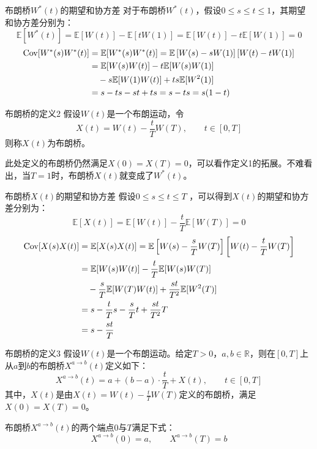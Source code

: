 \documentclass[t]{beamer}
\newcommand{\E}{\mathbb{E}}
\newcommand{\Cov}{{\rm Cov}}
\begin{document}
\begin{frame}{布朗桥$W^*(t)$的期望和协方差}
  对于布朗桥$W^*(t)$，假设$0\le s\le t\le 1$，其期望和协方差分别为：
  \begin{equation*}
  \E[W^*(t)]=\E[W(t)]-\E[tW(1)]=\E[W(t)]-t\E[W(1)]=0
  \end{equation*}
  \begin{equation*}
  \begin{split}
  \Cov[W^*(s)W^*(t)]&=\E[W^*(s)W^*(t)]=\E\left[W(s)-sW(1)\right]\left[W(t)-tW(1)\right]\\
  &=\E[W(s)W(t)]-t\E[W(s)W(1)]\\
  &\quad -s\E[W(1)W(t)]+ts\E[W^2(1)]\\
  &=s-ts-st+ts=s-ts=s(1-t)
  \end{split}
  \end{equation*}
\end{frame}


\begin{frame}{布朗桥的定义2}
  假设$W(t)$是一个布朗运动，令
  \begin{equation*}
  X(t)=W(t)-\frac{t}{T}W(T),\qquad t\in[0,T]
  \end{equation*}
  则称$X(t)$为布朗桥。

  此处定义的布朗桥仍然满足$X(0)=X(T)=0$，可以看作定义1的拓展。不难看出，当$T=1$时，布朗桥$X(t)$就变成了$W^*(t)$。
\end{frame}


\begin{frame}{布朗桥$X(t)$的期望和协方差}
  假设$0\le s\le t\le T$
  ，可以得到$X(t)$的期望和协方差分别为：
  \begin{equation*}
  \E[X(t)]=\E[W(t)]-\frac{t}{T}\E[W(T)]=0
  \end{equation*}
  \begin{equation*}
  \begin{split}
  \Cov[X(s)X(t)]&=\E[X(s)X(t)]=\E\left[W(s)-\frac{s}{T}W(T)\right]\left[W(t)-\frac{t}{T}W(T)\right]\\
  &=\E[W(s)W(t)]-\frac{t}{T}\E[W(s)W(T)]\\
  &\quad -\frac{s}{T}\E[W(T)W(t)]+\frac{st}{T^2}\E[W^2(T)]\\
  &=s-\frac{t}{T}s-\frac{s}{T}t+\frac{st}{T^2}T\\
  &=s-\frac{st}{T}
  \end{split}
  \end{equation*}
\end{frame}


\begin{frame}{布朗桥的定义3}
  假设$W(t)$是一个布朗运动。给定$T>0$，$a,b\in\mathbb{R}$，则在$[0,T]$上从$a$到$b$的布朗桥$X^{a\to b}(t)$定义如下：
  \begin{equation*}
  X^{a\to b}(t)=a+(b-a)\cdot \frac{t}{T}+X(t), \qquad t\in[0,T]
  \end{equation*}
  其中，$X(t)$是由$X(t)=W(t)-\frac{t}{T}W(T)$定义的布朗桥，满足$X(0)=X(T)=0$。

  布朗桥$X^{a\to b}(t)$的两个端点$0$与$T$满足下式：
\[X^{a\to b}(0)=a,\qquad X^{a\to b}(T)=b \]
\end{frame}
\end{document}
